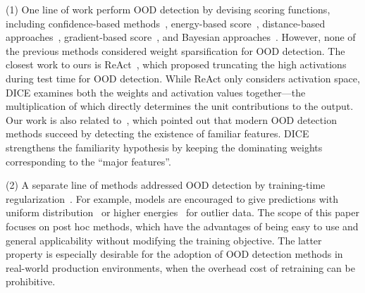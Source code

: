 \documentclass[runningheads]{llncs}
\begin{document}
(1) One line of work perform OOD detection by devising scoring functions, including confidence-based methods~\cite{bendale2016towards,Kevin,huang2021mos,liang2018enhancing}, energy-based score~\cite{lin2021mood,liu2020energy,morteza2022provable,wang2021canmulti,sun2021react}, distance-based approaches~\cite{lee2018simple,2021ssd,sun2022knnood,tack2020csi}, gradient-based score~\cite{huang2021importance}, and Bayesian approaches~\cite{gal2016dropout,lakshminarayanan2017simple,maddox2019simple,malinin2018predictive,dpn19nips}. However, {none} of the previous methods considered weight sparsification for OOD detection. 
The closest work to ours is ReAct~\cite{sun2021react}, which proposed truncating the
high activations during test time for OOD detection. While ReAct only considers activation space, DICE examines both the weights and
activation values together---the multiplication of which directly determines the unit contributions to the output. Our work is also related to~\cite{dietterich2022familiarity}, which pointed out that modern OOD detection methods succeed by detecting the existence of familiar features. DICE strengthens the familiarity hypothesis by keeping the dominating weights corresponding to the ``major features''.  


(2) A separate line of methods addressed OOD detection by training-time regularization~\cite{bevandic2018discriminative,chen2021atom,geifman2019selectivenet,hein2019relu,hendrycks2018deep,jeong2020ood,katzsamuels2022training,lee2017training,liu2020energy,malinin2018predictive,meinke2019towards,ming2022posterior,mohseni2020self,van2020uncertainty,hongxin2022logitnorm,yang2021semantic}.
For example, models are encouraged to give predictions with uniform distribution~\cite{hendrycks2018deep,lee2017training} or higher energies~\cite{du2022unknown,du2022vos,katzsamuels2022training,liu2020energy,ming2022posterior} for outlier data. The scope of this paper focuses on post hoc methods, which have the advantages of being easy to use and general applicability without modifying the training objective. The latter property is especially desirable for the adoption of OOD detection methods in real-world production environments, when the overhead cost of retraining can be  prohibitive. \\
\end{document}
